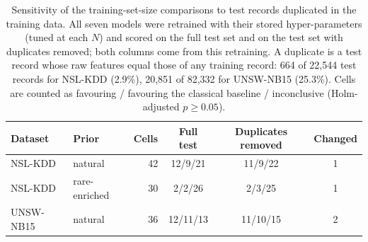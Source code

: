 \begin{table}[t]
\centering
\caption{Sensitivity of the training-set-size comparisons to test records duplicated in the
training data. All seven models were retrained with their stored hyper-parameters (tuned at
each $N$) and scored on the full test set and on the test set with duplicates removed; both
columns come from this retraining. A duplicate is a test record whose raw features equal
those of any training record: 664 of
22,544 test records for NSL-KDD (2.9\%),
20,851 of 82,332 for UNSW-NB15
(25.3\%). Cells are counted as favouring \QSVM{} /
favouring the classical baseline / inconclusive (Holm-adjusted $p\ge0.05$).}
\label{tab:dedup}
\footnotesize
\setlength{\tabcolsep}{4pt}
\begin{tabular}{@{}ll r ccc@{}}
\toprule
Dataset & Prior & Cells & Full test & Duplicates removed & Changed \\
\midrule
NSL-KDD & natural & 42 & 12/9/21 & 11/9/22 & 1 \\
NSL-KDD & rare-enriched & 30 & 2/2/26 & 2/3/25 & 1 \\
UNSW-NB15 & natural & 36 & 12/11/13 & 11/10/15 & 2 \\
\bottomrule
\end{tabular}
\end{table}

